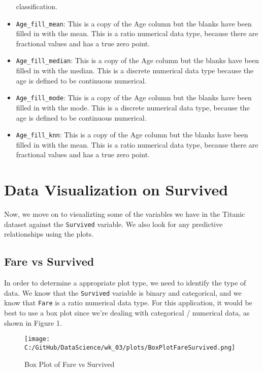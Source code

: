 \documentclass[a4paper, twocolumn]{article}
\begin{document}
\begin{itemize}
    classification.
    \item \texttt{Age\_fill\_mean}: This is a copy of the Age column but the blanks have been filled in with the mean.
    This is a ratio numerical data type, because there are  fractional values and has a true zero point.
    \item \texttt{Age\_fill\_median}: This is a copy of the Age column but the blanks have been filled in with the
    median. This is a discrete numerical data type because the age is defined to be continuous numerical.
    \item \texttt{Age\_fill\_mode}: This is a copy of the Age column but the blanks have been filled in with the mode.
    This is a discrete numerical data type, because the age is defined to be continuous numerical.
    \item \texttt{Age\_fill\_knn}: This is a copy of the Age column but the blanks have been filled in with the mean.
    This is a ratio numerical data type, because there are fractional values and has a true zero point.
\end{itemize}

\section{Data Visualization on Survived}
Now, we move on to visualizting some of the variables we have in the Titanic dataset against the \texttt{Survived}
variable. We also look for any predictive relationships using the plots.

\subsection{Fare vs Survived}
In order to determine a appropriate plot type, we need to identify the type of data. We know that the 
\texttt{Survived} variable is binary and categorical, and we know that \texttt{Fare} is a ratio numerical data type.
For this application, it would be best to use a box plot since we're dealing with categorical / numerical data, as 
shown in Figure 1.



\begin{figure}[h!] 
    \centering
    \noindent
    \texttt{[image: C:/GitHub/DataScience/wk\_03/plots/BoxPlotFareSurvived.png]}  
    \caption{Box Plot of Fare vs Survived} 
\end{figure}
\end{document}
